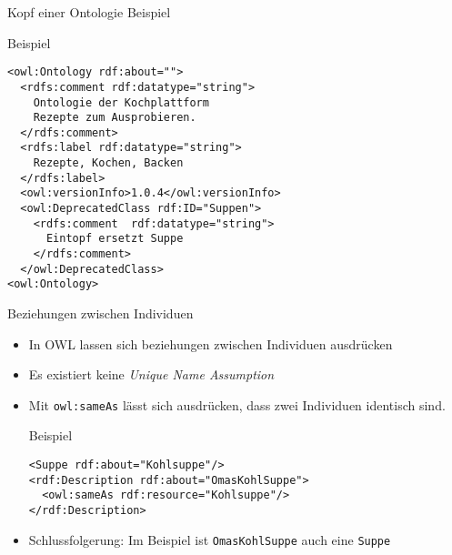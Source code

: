\documentclass{beamer}
\begin{document}
\begin{frame}[fragile]{Kopf einer Ontologie Beispiel}
\begin{block}{Beispiel}
\begin{lstlisting}[lang="xml"]
<owl:Ontology rdf:about=""> 
  <rdfs:comment rdf:datatype="string">
    Ontologie der Kochplattform 
    Rezepte zum Ausprobieren.		
  </rdfs:comment>
  <rdfs:label rdf:datatype="string">
    Rezepte, Kochen, Backen
  </rdfs:label>
  <owl:versionInfo>1.0.4</owl:versionInfo>
  <owl:DeprecatedClass rdf:ID="Suppen">
    <rdfs:comment  rdf:datatype="string">
      Eintopf ersetzt Suppe
    </rdfs:comment>
  </owl:DeprecatedClass>
<owl:Ontology>
\end{lstlisting}
\end{block}
\end{frame}



\begin{frame}[fragile]{Beziehungen zwischen Individuen}
\begin{itemize}
\item In OWL lassen sich beziehungen zwischen Individuen ausdrücken
\item Es existiert keine \emph{Unique Name Assumption}
\item Mit \texttt{owl:sameAs} lässt sich ausdrücken, dass zwei
Individuen identisch sind.

\begin{exampleblock}{Beispiel}
\begin{lstlisting}[lang="xml"]
<Suppe rdf:about="Kohlsuppe"/>
<rdf:Description rdf:about="OmasKohlSuppe">
  <owl:sameAs rdf:resource="Kohlsuppe"/>
</rdf:Description>
\end{lstlisting}
\end{exampleblock}
\item \alert{Schlussfolgerung:} Im Beispiel ist \texttt{OmasKohlSuppe} auch eine
\texttt{Suppe}
\end{itemize}
\end{frame}
\end{document}
